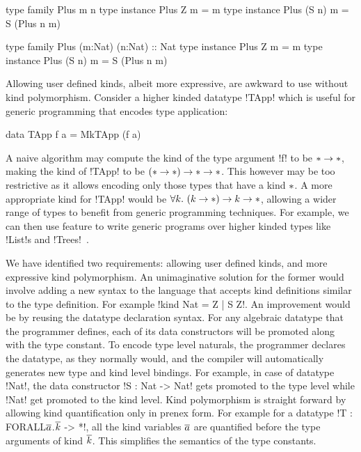 \documentclass[screen,nonacm,manuscript,review]{acmart} %
\begin{document}
\begin{minipage}[ht]{0.4\linewidth}
\begin{code}
     type family Plus m n
     type instance Plus Z m = m
     type instance Plus (S n) m = S (Plus n m)
\end{code}
\end{minipage}
\begin{minipage}[ht]{0.4\linewidth}
\begin{code}
     type family Plus (m:Nat) (n:Nat) :: Nat
     type instance Plus Z m = m
     type instance Plus (S n) m = S (Plus n m)
\end{code}
\end{minipage}

Allowing user defined kinds, albeit more expressive, are awkward to use without kind polymorphism. Consider a higher kinded datatype !TApp! which is useful for generic programming that encodes type application:

\begin{CenteredBox}
\begin{code}
data TApp f a = MkTApp (f a)
\end{code}
\end{CenteredBox}

A naive algorithm may compute the kind of the type argument !f! to be $\ast \to \ast$, making the kind of !TApp! to be $(\ast \to \ast) \to \ast \to \ast$. This however may be too restrictive as it allows encoding only those types that have a kind $\ast$. A more appropriate kind for !TApp! would be $\forall k.~(k\to\ast) \to k \to \ast$, allowing a wider range of types to benefit from generic programming techniques. For example, we can then use feature to write generic programs over higher kinded types like !List!s and !Trees!~\cite{magalhaes_generic_2010}.

We have identified two requirements: allowing user defined kinds, and
more expressive kind polymorphism. An unimaginative solution for the former would involve adding a new syntax to the language that accepts kind definitions similar to the type definition. For example !kind Nat = Z | S Z!. An improvement would be by reusing the datatype declaration syntax. For any algebraic datatype that the programmer defines, each of its data constructors will be promoted along with the type constant. To encode type level naturals, the programmer declares the datatype, as they normally would, and the compiler will automatically generates new type and kind level bindings. For example, in case of datatype !Nat!, the data constructor !S : Nat -> Nat! gets promoted to the type level while !Nat! get promoted to the kind level. Kind polymorphism is straight forward by allowing kind quantification only in prenex form. For example for a datatype !T : FORALL$\overline{a}$.$\overline{k}$ -> *!, all the kind variables $\overline{a}$ are quantified before the type arguments of kind $\overline{k}$. This simplifies the semantics of the type constants.
\end{document}
